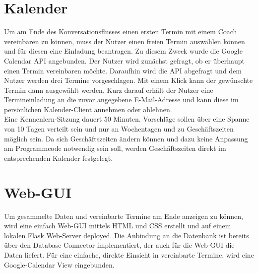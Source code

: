     \section{Kalender} \label{Realisierung: calendar}
        Um am Ende des Konversationsflusses einen ersten Termin mit einem Coach vereinbaren zu können, muss der Nutzer einen freien Termin auswählen können und für diesen eine Einladung beantragen. Zu diesem Zweck wurde die Google Calendar API angebunden. Der Nutzer wird zunächst gefragt, ob er überhaupt einen Termin vereinbaren möchte. Daraufhin wird die API abgefragt und dem Nutzer werden drei Termine vorgeschlagen. Mit einem Klick kann der gewünschte Termin dann ausgewählt werden. Kurz darauf erhält der Nutzer eine Termineinladung an die zuvor angegebene E-Mail-Adresse und kann diese im persönlichen Kalender-Client annehmen oder ablehnen. \\
        Eine Kennenlern-Sitzung dauert 50 Minuten. Vorschläge sollen über eine Spanne von 10 Tagen verteilt sein und nur an Wochentagen und zu Geschäftszeiten möglich sein. Da sich Geschäftszeiten ändern können und dazu keine Anpassung am Programmcode notwendig sein soll, werden Geschäftszeiten direkt im entsprechenden Kalender festgelegt.

    
    \section{Web-GUI} \label{Realisierung: web gui}
        Um gesammelte Daten und vereinbarte Termine am Ende anzeigen zu können, wird eine einfach Web-GUI mittels HTML und CSS erstellt und auf einem lokalen Flask Web-Server deployed. Die Anbindung an die Datenbank ist bereits über den Database Connector implementiert, der auch für die Web-GUI die Daten liefert. Für eine einfache, direkte Einsicht in vereinbarte Termine, wird eine Google-Calendar View eingebunden. 